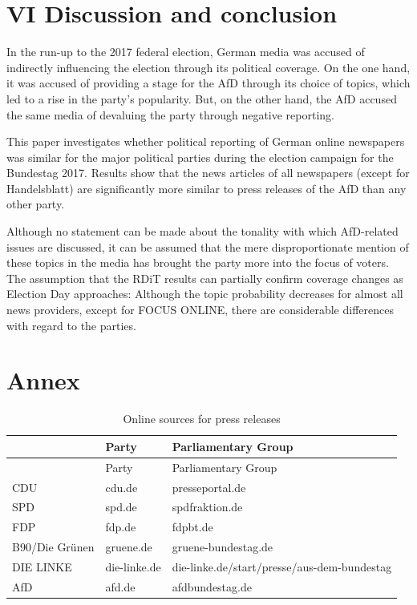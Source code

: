 \documentclass[
]{article}
\begin{document}
\hypertarget{vi-discussion-and-conclusion}{%
\section{VI Discussion and
conclusion}\label{vi-discussion-and-conclusion}}

In the run-up to the 2017 federal election, German media was accused of
indirectly influencing the election through its political coverage. On
the one hand, it was accused of providing a stage for the AfD through
its choice of topics, which led to a rise in the party's popularity.
But, on the other hand, the AfD accused the same media of devaluing the
party through negative reporting.

This paper investigates whether political reporting of German online
newspapers was similar for the major political parties during the
election campaign for the Bundestag 2017. Results show that the news
articles of all newspapers (except for Handelsblatt) are significantly
more similar to press releases of the AfD than any other party.

Although no statement can be made about the tonality with which
AfD-related issues are discussed, it can be assumed that the mere
disproportionate mention of these topics in the media has brought the
party more into the focus of voters. The assumption that the RDiT
results can partially confirm coverage changes as Election Day
approaches: Although the topic probability decreases for almost all news
providers, except for FOCUS ONLINE, there are considerable differences
with regard to the parties.

\newpage

\hypertarget{annex}{%
\section{Annex}\label{annex}}

\begin{longtable}[]{@{}lll@{}}
\caption{Online sources for press releases
\label{table:press_releases_sources}}\tabularnewline
\toprule
& Party & Parliamentary Group \\
\midrule
\endfirsthead
\toprule
& Party & Parliamentary Group \\
\midrule
\endhead
CDU & cdu.de & presseportal.de \\
SPD & spd.de & spdfraktion.de \\
FDP & fdp.de & fdpbt.de \\
B90/Die Grünen & gruene.de & gruene-bundestag.de \\
DIE LINKE & die-linke.de &
die-linke.de/start/presse/aus-dem-bundestag \\
AfD & afd.de & afdbundestag.de \\
\bottomrule
\end{longtable}
\end{document}
